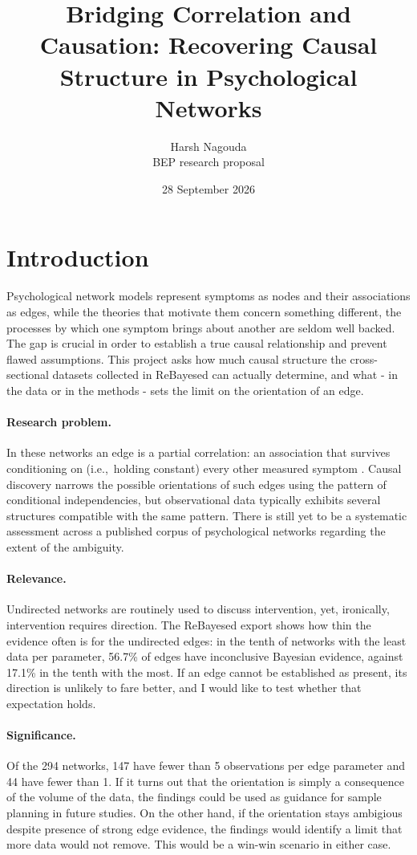 \documentclass[a4paper]{article}
\title{Bridging Correlation and Causation: Recovering Causal Structure in Psychological Networks}
\author{Harsh Nagouda \\ \small BEP research proposal}
\date{28 September 2026}
\begin{document}
\maketitle

\section{Introduction}

Psychological network models represent symptoms as nodes and their associations as
edges, while the theories that motivate them concern something different, the processes
by which one symptom brings about another are seldom well backed. The gap is crucial in 
order to establish a true causal relationship and prevent flawed assumptions.
This project asks how much causal structure the cross-sectional datasets collected in
ReBayesed can actually determine, and what {-} in the data or in the methods {-} sets the limit on the orientation of an edge.

\paragraph{Research problem.} In these networks an edge is a partial correlation: an
association that survives conditioning on (i.e.,\ holding constant) every other measured symptom \citep{borsboom2013}. Causal discovery narrows the possible orientations of such edges using the pattern of conditional independencies, but observational data typically exhibits several structures compatible with the same pattern. There is still yet to be a systematic assessment across a published corpus of psychological networks regarding the extent of the ambiguity.

\paragraph{Relevance.} Undirected networks are routinely used to discuss intervention,
yet, ironically, intervention requires direction. The ReBayesed export shows how thin the evidence
often is for the undirected edges: in the tenth of networks with the least data per
parameter, 56.7\% of edges have inconclusive Bayesian evidence, against 17.1\% in the
tenth with the most. If an edge cannot be established as present, its direction is
unlikely to fare better, and I would like to test whether that expectation holds.

\paragraph{Significance.} Of the 294 networks, 147 have fewer than 5 observations per
edge parameter and 44 have fewer than 1. If it turns out that the orientation is simply a consequence of the volume of the data, the findings could be used as guidance for sample planning in future studies. On the other hand, if the orientation stays ambigious despite presence of strong edge evidence, the findings would identify a limit that more data would not remove. This would be a win-win scenario in either case. 
\end{document}

